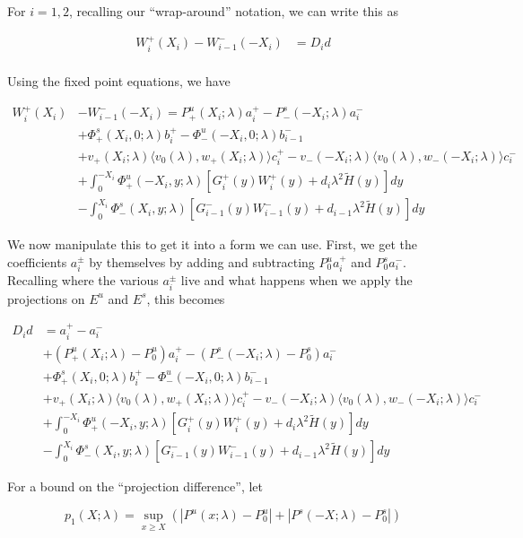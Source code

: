 \documentclass[12pt]{article}
\begin{document}
For $i = 1, 2$, recalling our ``wrap-around'' notation, we can write this as

\begin{align*}
W_i^+(X_i) - W_{i-1}^-(-X_i) &= D_i d \\
\end{align*}

Using the fixed point equations, we have

\begin{align*}
W_i^+(X_i) &- W_{i-1}^-(-X_i) = P^u_+(X_i; \lambda) a_i^+ - P^s_-(-X_i; \lambda) a_i^- \\
&+ \Phi^s_+(X_i, 0; \lambda)b_i^+ - \Phi^u_-(-X_i, 0; \lambda)b_{i-1}^- \\
&+ v_+(X_i; \lambda) \langle v_0(\lambda), w_+(X_i; \lambda) \rangle c_i^+ - v_-(-X_i; \lambda) \langle v_0(\lambda), w_-(-X_i; \lambda) \rangle c_i^- \\
&+ \int_0^{-X_i} \Phi^u_+(-X_i, y; \lambda) [ G_i^+(y) W_i^+(y) + d_i \lambda^2 \tilde{H}(y) ] dy \\
&- \int_0^{X_i} \Phi^s_-(X_i, y; \lambda) [ G_{i-1}^-(y) W_{i-1}^-(y) + d_{i-1} \lambda^2 \tilde{H}(y) ] dy
\end{align*}

We now manipulate this to get it into a form we can use. First, we get the coefficients $a_i^\pm$ by themselves by adding and subtracting $P_0^u a_i^+$ and $P_0^s a_i^-$. Recalling where the various $a_i^\pm$ live and what happens when we apply the projections on $E^u$ and $E^s$, this becomes

\begin{align*}
D_i d &= a_i^+ - a_i^- \\
&+ (P^u_+(X_i; \lambda) - P_0^u)a_i^+ - (P^s_-(-X_i; \lambda) - P_0^s)a_i^- \\
&+ \Phi^s_+(X_i, 0; \lambda)b_i^+ - \Phi^u_-(-X_i, 0; \lambda)b_{i-1}^- \\
&+ v_+(X_i; \lambda) \langle v_0(\lambda), w_+(X_i; \lambda) \rangle c_i^+ - v_-(-X_i; \lambda) \langle v_0(\lambda), w_-(-X_i; \lambda) \rangle c_i^- \\
&+ \int_0^{-X_i} \Phi^u_+(-X_i, y; \lambda) [ G_i^+(y) W_i^+(y) + d_i \lambda^2 \tilde{H}(y) ] dy \\
&- \int_0^{X_i} \Phi^s_-(X_i, y; \lambda) [ G_{i-1}^-(y) W_{i-1}^-(y) + d_{i-1} \lambda^2 \tilde{H}(y) ] dy
\end{align*}

For a bound on the ``projection difference'', let

\[
p_1(X;\lambda) = \sup_{x \geq X} (|P^u(x; \lambda) - P_0^u| + |P^s(-X; \lambda) - P_0^s|)
\]
\end{document}
